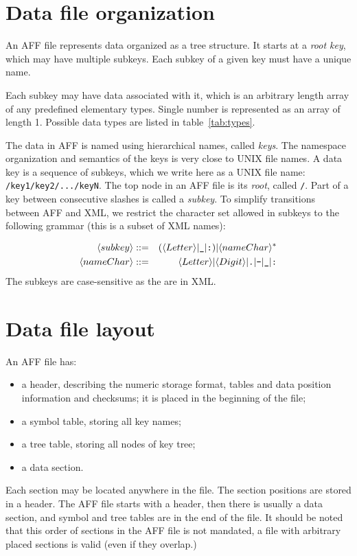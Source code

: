\documentclass[10pt,letterpaper]{article}
\newcommand{\bi}{\begin{itemize}}
\newcommand{\ei}{\end{itemize}}             %
\newcommand{\term}[1]{\textit{#1}\index{\textit{#1}}}          %
\newcommand{\ctext}[1]{\texttt{#1}}         %
\begin{document}
\section{Data file organization}\label{file-org}
An AFF file represents data organized as a tree structure. 
It starts at a \term{root key}, which may have multiple subkeys. 
Each subkey of a given key must have a unique name. 

Each subkey may have data associated with it, which is an arbitrary length array of any
predefined elementary types.
Single number is represented as an array of length 1.
Possible data types are listed in table~\ref{tab:types}.

The data in AFF is named using hierarchical names, called
\term{keys}. The namespace organization and semantics of the keys is
very close to UNIX file names. A data key is a sequence of subkeys,
which we write here as a UNIX file name:
\ctext{/key1/key2/.../keyN}. The top node in an AFF file is its
\term{root}, called \ctext{/}. Part of a key between consecutive
slashes is called a \term{subkey}. To simplify transitions between AFF
and XML, we restrict the character set allowed in subkeys to the
following grammar (this is a subset of XML names):

\begin{eqnarray*}
\langle subkey \rangle & ::= & (\langle Letter \rangle | \verb|_| | \verb|:| ) | \langle nameChar \rangle^{*} \\
\langle nameChar \rangle & ::= & \langle Letter \rangle | \langle Digit \rangle | \verb|.| | \verb|-| | \verb|_| | \verb|:|
\end{eqnarray*}
The subkeys are case-sensitive as the are in XML.

\section{Data file layout}
An AFF file has:
\bi
\item a header, describing the numeric storage format, tables and data
  position information and checksums; it is placed in the beginning of
  the file;
\item a symbol table, storing all key names;
\item a tree table, storing all nodes of key tree;
\item a data section.
\ei

Each section may be located anywhere in the file.  The section positions
are stored in a header.  The AFF file starts with a header, then there
is usually a data section, and symbol and tree tables are in the end
of the file. It should be noted that this order of sections in the AFF
file is not mandated, a file with arbitrary placed sections is valid
(even if they overlap.)
\end{document}
